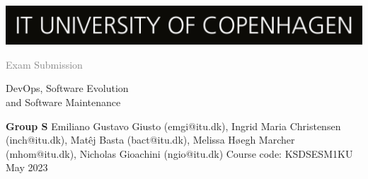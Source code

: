 

\hspace{3.3cm}\includegraphics[width = 0.5\linewidth]{images/itulogo.jpg}    

\vspace{1.5cm}

\noindent \textcolor{gray}{\huge{Exam Submission}}

\noindent \Huge{DevOps, Software Evolution\\ and Software Maintenance} \newline


\normalsize
\noindent \textbf{Group S} \newline
Emiliano Gustavo Giusto (emgi@itu.dk), \newline
Ingrid Maria Christensen (inch@itu.dk),\newline
Matêj Basta (bact@itu.dk), \newline
Melissa Høegh Marcher (mhom@itu.dk), \newline
Nicholas Gioachini (ngio@itu.dk) \newline \newline
Course code: KSDSESM1KU \newline
May 2023

\begin{figure}[H]
\end{figure}

\restoregeometry

